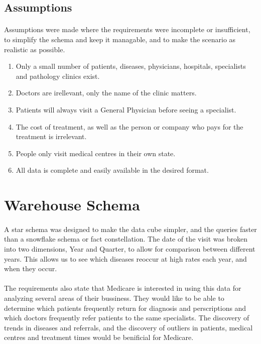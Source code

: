 \documentclass[a4paper,12pt,openbib]{article}
\begin{document}
\subsection*{Assumptions}
\paragraph{}
Assumptions were made where the requirements were incomplete or insufficient, to simplify the schema and keep it managable, and to make the scenario as realistic as possible.
\begin{enumerate}
	\item Only a small number of patients, diseases, physicians, hospitals, specialists and pathology clinics exist.
	\item Doctors are irellevant, only the name of the clinic matters.
	\item Patients will always visit a General Physician before seeing a specialist.
	\item The cost of treatment, as well as the person or company who pays for the treatment is irrelevant.
	\item People only visit medical centres in their own state.
	\item All data is complete and easily available in the desired format.
\end{enumerate}

\section*{Warehouse Schema}
\paragraph{}
A star schema was designed to make the data cube simpler, and the queries faster than a snowflake schema or fact constellation.
The date of the visit was broken into two dimensions, Year and Quarter, to allow for comparison between different years.
This allows us to see which diseases reoccur at high rates each year, and when they occur.
\paragraph{}
The requirements also state that Medicare is interested in using this data for analyzing several areas of their bussiness.
They would like to be able to determine which patients frequently return for diagnosis and perscriptions and which doctors frequently refer patients to the same specialists.
The discovery of trends in diseases and referrals, and the discovery of outliers in patients, medical centres and treatment times would be benificial for Medicare.
\end{document}
